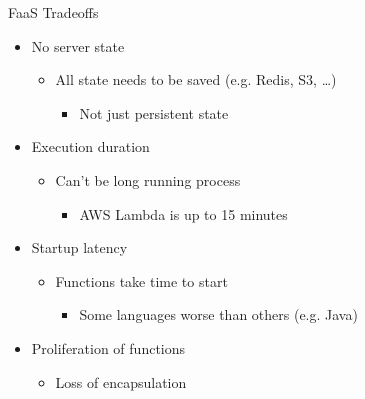 \documentclass{slide}
\begin{document}
\begin{frame}{FaaS Tradeoffs}
\vspace{1pt}
{\huge
\begin{itemize}
    \item<1-> No server state
    \vspace{5pt}
    \begin{itemize}
        \LARGE\item All state needs to be saved (e.g. Redis, S3, \dots)
        \begin{itemize}
            \Large\item Not just persistent state
        \end{itemize}
    \end{itemize}
    \vspace{1mm}
    \item<2-> Execution duration
    \vspace{4pt}
    \begin{itemize}
        \LARGE\item Can't be long running process
        \begin{itemize}
            \Large\item AWS Lambda is up to 15 minutes
        \end{itemize}
    \end{itemize}
    \vspace{1mm}
    \item<3-> Startup latency
    \begin{itemize}
        \LARGE\item Functions take time to start
        \begin{itemize}
            \Large\item Some languages worse than others (e.g. Java)
        \end{itemize}
    \end{itemize}
    \vspace{1mm}
    \item<4-> Proliferation of functions
    \begin{itemize}
        \LARGE\item Loss of encapsulation
    \end{itemize}
\end{itemize}
}
\end{frame}
\end{document}
